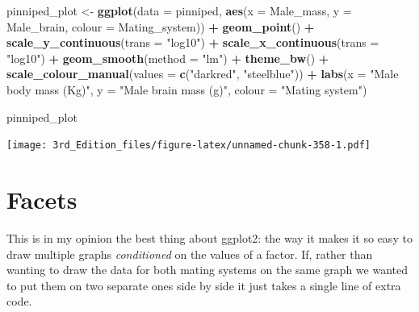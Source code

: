 \documentclass[
]{book}
\newenvironment{Shaded}{\begin{snugshade}}{\end{snugshade}}
\newcommand{\DataTypeTok}[1]{\textcolor[rgb]{0.13,0.29,0.53}{#1}}
\newcommand{\KeywordTok}[1]{\textcolor[rgb]{0.13,0.29,0.53}{\textbf{#1}}}
\newcommand{\NormalTok}[1]{#1}
\newcommand{\OperatorTok}[1]{\textcolor[rgb]{0.81,0.36,0.00}{\textbf{#1}}}
\newcommand{\StringTok}[1]{\textcolor[rgb]{0.31,0.60,0.02}{#1}}
\begin{document}
\begin{Shaded}
\begin{Highlighting}[]

\NormalTok{pinniped_plot <-}\StringTok{ }\KeywordTok{ggplot}\NormalTok{(}\DataTypeTok{data =}\NormalTok{ pinniped, }\KeywordTok{aes}\NormalTok{(}\DataTypeTok{x =}\NormalTok{ Male_mass, }\DataTypeTok{y =}\NormalTok{ Male_brain, }\DataTypeTok{colour =}\NormalTok{ Mating_system)) }\OperatorTok{+}
\StringTok{        }\KeywordTok{geom_point}\NormalTok{() }\OperatorTok{+}\StringTok{ }
\StringTok{        }\KeywordTok{scale_y_continuous}\NormalTok{(}\DataTypeTok{trans =} \StringTok{"log10"}\NormalTok{) }\OperatorTok{+}
\StringTok{        }\KeywordTok{scale_x_continuous}\NormalTok{(}\DataTypeTok{trans =} \StringTok{"log10"}\NormalTok{) }\OperatorTok{+}
\StringTok{        }\KeywordTok{geom_smooth}\NormalTok{(}\DataTypeTok{method =} \StringTok{"lm"}\NormalTok{) }\OperatorTok{+}
\StringTok{        }\KeywordTok{theme_bw}\NormalTok{() }\OperatorTok{+}
\StringTok{        }\KeywordTok{scale_colour_manual}\NormalTok{(}\DataTypeTok{values =} \KeywordTok{c}\NormalTok{(}\StringTok{"darkred"}\NormalTok{, }\StringTok{"steelblue"}\NormalTok{)) }\OperatorTok{+}
\StringTok{        }\KeywordTok{labs}\NormalTok{(}\DataTypeTok{x =} \StringTok{"Male body mass (Kg)"}\NormalTok{,}
             \DataTypeTok{y =} \StringTok{"Male brain mass (g)"}\NormalTok{,}
             \DataTypeTok{colour =} \StringTok{"Mating system"}\NormalTok{)}

\NormalTok{pinniped_plot}
\end{Highlighting}
\end{Shaded}

\texttt{[image: 3rd\_Edition\_files/figure-latex/unnamed-chunk-358-1.pdf]}

\hypertarget{facets}{%
\section{Facets}\label{facets}}

This is in my opinion the best thing about ggplot2: the way it makes it so easy to draw multiple graphs \emph{conditioned} on the values of a factor. If, rather than wanting to draw the data for both mating systems on the same graph we wanted to put them on two separate ones side by side it just takes a single line of extra code.
\end{document}
